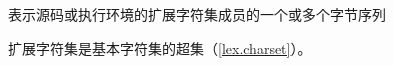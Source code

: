 表示源码或执行环境的扩展字符集成员的一个或多个字节序列

\begin{note}[\noindent]
  扩展字符集是基本字符集的超集（\ref{lex.charset}）。
\end{note}
